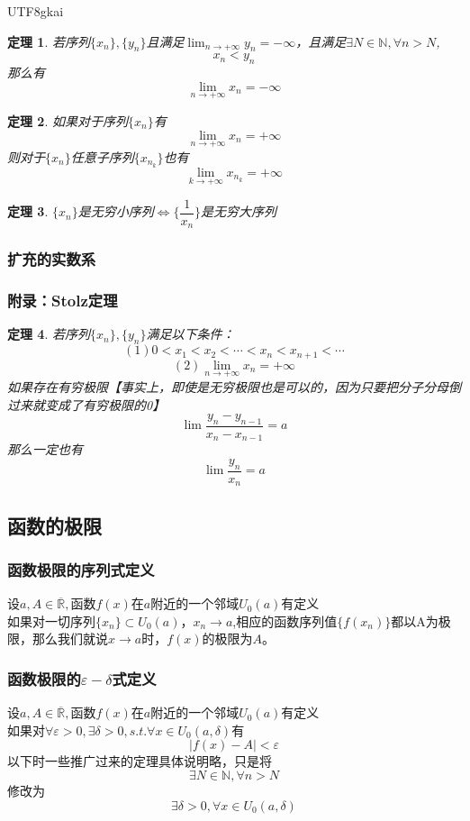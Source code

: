 \documentclass{article}
\newtheorem{theorem}{定理}[subsection]
\begin{document}
\begin{CJK}{UTF8}{gkai}
\begin{theorem}
若序列$\{x_n\},\{y_n\}$且满足$\lim_{n\to +\infty}y_n=-\infty$，且满足$\exists N\in \mathbb{N},\forall n > N$,
\[x_n<y_n\]
那么有
\[\lim_{n\to +\infty}x_n=-\infty\]
\end{theorem}
\begin{theorem}

如果对于序列$\{x_n\}$有
\[\lim_{n\to +\infty}x_n=+\infty\]
则对于$\{x_n\}$任意子序列$\{x_{n_k}\}$也有
\[\lim_{k\to +\infty}x_{n_k}=+\infty\]
\end{theorem}
\begin{theorem}

$\{x_n\}$是无穷小序列$\Leftrightarrow\{\dfrac{1}{x_n}\}$是无穷大序列\\
\end{theorem}

\subsubsection{扩充的实数系}
\subsubsection{附录：Stolz定理}
\begin{theorem}
若序列$\{x_n\},\{y_n\}$满足以下条件：
\[(1)0<x_1<x_2<\cdots<x_n<x_{n+1}<\cdots\]
\[(2)\lim_{n\to +\infty}x_n=+\infty\]
如果存在有穷极限【事实上，即使是无穷极限也是可以的，因为只要把分子分母倒过来就变成了有穷极限的0】\\
\[\lim\frac{y_n-y_{n-1}}{x_n-x_{n-1}}=a\]
那么一定也有
\[\lim\frac{y_n}{x_n}=a\]
\end{theorem}
\subsection{函数的极限}
\subsubsection{函数极限的序列式定义}
设$a,A\in\overline{\mathbb{R}},$函数$f(x)$在$a$附近的一个邻域$U_0(a)$有定义\\
如果对一切序列$\{x_n\}\subset U_0(a)$，$x_n\to a$,相应的函数序列值$\{f(x_n)\}$都以A为极限，那么我们就说$x\to a $时，$f(x)$的极限为$A$。

\subsubsection{函数极限的$\varepsilon-\delta$式定义}
设$a,A\in\overline{\mathbb{R}},$函数$f(x)$在$a$附近的一个邻域$U_0(a)$有定义\\
如果对$\forall \varepsilon >0,\exists \delta>0,s.t. \forall x\in U_0(a,\delta)$有
\[|f(x)-A|<\varepsilon\]
以下时一些推广过来的定理具体说明略，只是将
\[\exists N\in \mathbb{N},\forall n>N\]
修改为
\[\exists \delta>0,\forall x\in U_0(a,\delta)\]

\end{CJK}
\end{document}

